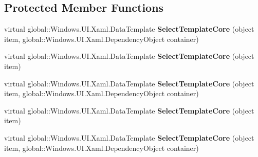 \subsection*{Protected Member Functions}
\begin{DoxyCompactItemize}
\item 
\mbox{\label{class_windows_1_1_u_i_1_1_xaml_1_1_controls_1_1_data_template_selector_a1550a78f9267fb5b27f3ddbb354bc449}} 
virtual global\+::\+Windows.\+U\+I.\+Xaml.\+Data\+Template {\bfseries Select\+Template\+Core} (object item, global\+::\+Windows.\+U\+I.\+Xaml.\+Dependency\+Object container)
\item 
\mbox{\label{class_windows_1_1_u_i_1_1_xaml_1_1_controls_1_1_data_template_selector_af652d1861b784ec9c0ef1f7c0bb53734}} 
virtual global\+::\+Windows.\+U\+I.\+Xaml.\+Data\+Template {\bfseries Select\+Template\+Core} (object item)
\item 
\mbox{\label{class_windows_1_1_u_i_1_1_xaml_1_1_controls_1_1_data_template_selector_a1550a78f9267fb5b27f3ddbb354bc449}} 
virtual global\+::\+Windows.\+U\+I.\+Xaml.\+Data\+Template {\bfseries Select\+Template\+Core} (object item, global\+::\+Windows.\+U\+I.\+Xaml.\+Dependency\+Object container)
\item 
\mbox{\label{class_windows_1_1_u_i_1_1_xaml_1_1_controls_1_1_data_template_selector_af652d1861b784ec9c0ef1f7c0bb53734}} 
virtual global\+::\+Windows.\+U\+I.\+Xaml.\+Data\+Template {\bfseries Select\+Template\+Core} (object item)
\item 
\mbox{\label{class_windows_1_1_u_i_1_1_xaml_1_1_controls_1_1_data_template_selector_a1550a78f9267fb5b27f3ddbb354bc449}} 
virtual global\+::\+Windows.\+U\+I.\+Xaml.\+Data\+Template {\bfseries Select\+Template\+Core} (object item, global\+::\+Windows.\+U\+I.\+Xaml.\+Dependency\+Object container)
\item 
\mbox{\label{class_windows_1_1_u_i_1_1_xaml_1_1_controls_1_1_data_template_selector_af652d1861b784ec9c0ef1f7c0bb53734}} 

\end{DoxyCompactItemize}
